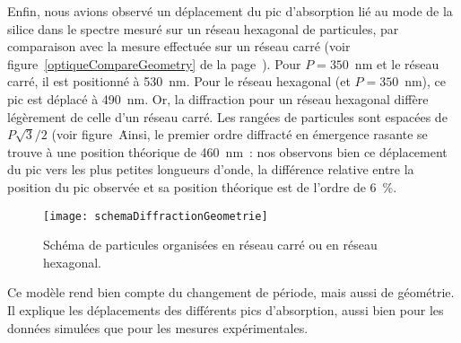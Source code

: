 Enfin, nous avions observé un déplacement du pic d'absorption lié au mode de la silice dans le spectre mesuré sur un réseau hexagonal de particules, par comparaison avec la mesure effectuée sur un réseau carré (voir figure~\ref{optiqueCompareGeometry} de la page~\pageref{optiqueCompareGeometry}). Pour $P = 350$~nm et le réseau carré, il est positionné à 530~nm. Pour le réseau hexagonal (et $P=350$~nm), ce pic est déplacé à 490~nm. Or, la diffraction pour un réseau hexagonal diffère légèrement de celle d'un réseau carré. Les rangées de particules sont espacées de $P\sqrt{3}/2$ (voir figure~\. Ainsi, le premier ordre diffracté en émergence rasante se trouve à une position théorique de 460~nm~: nos observons bien ce déplacement du pic vers les plus petites longueurs d'onde, la différence relative entre la position du pic observée et sa position théorique est de l'ordre de 6~\%.\par 
\begin{figure}[!htb]
\centering
\texttt{[image: schemaDiffractionGeometrie]}
\caption{Schéma de particules organisées en réseau carré ou en réseau hexagonal.}
\label{schemaDiffractionGeometrie}
\end{figure}

Ce modèle rend bien compte du changement de période, mais aussi de géométrie. Il explique les déplacements des différents pics d'absorption, aussi bien pour les données simulées que pour les mesures expérimentales.\par 

